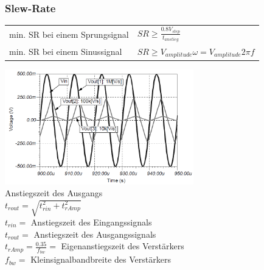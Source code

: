 		\subsubsection{Slew-Rate}
		\begin{tabular}{ll}
			min. SR bei einem Sprungsignal &
			$SR\geq\frac{0.8V_{step}}{t_{anstieg}}$\\ 
			min. SR bei einem Sinussignal & 
			$SR\geq V_{amplitude}\omega=V_{amplitude}2\pi f$\\
		\end{tabular}

		\includegraphics[height=5cm]{./bilder/slew-rate.png}\\
		Anstiegszeit des Ausgangs \\
		$t_{rout} = \sqrt{t_{rin}^2 + t_{rAmp}^2}$ \\
		$t_{rin} = $ Anstiegszeit des Eingangssignals \\
		$t_{rout} = $ Anstiegszeit des Ausgangssignals \\
		$t_{rAmp} = \frac{0.35}{f_{bw}} = $ Eigenanstiegszeit des Verstärkers \\
		$f_{bw} = $ Kleinsignalbandbreite des Verstärkers \\


